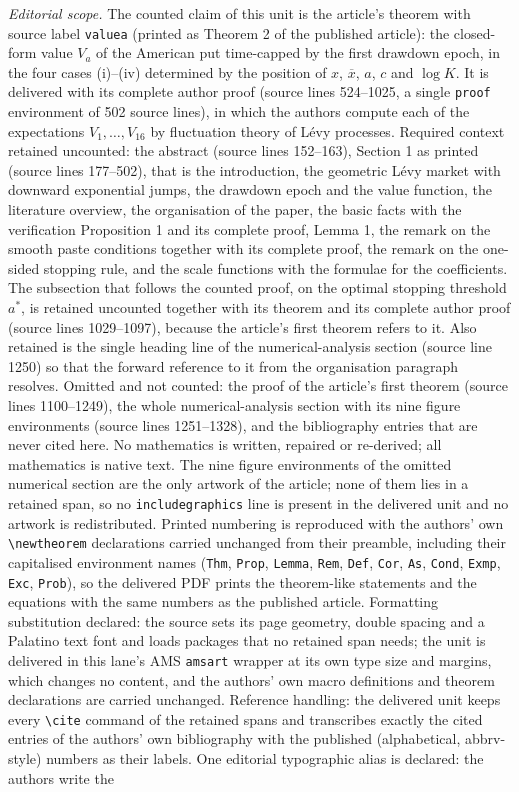 \documentclass[10pt,a4paper]{amsart}
\begin{document}
\noindent\textit{Editorial scope.} The counted claim of this unit is the article's theorem with source label \texttt{valuea} (printed as Theorem 2 of the published article): the closed-form value $V_a$ of the American put time-capped by the first drawdown epoch, in the four cases (i)--(iv) determined by the position of $x$, $\overline{x}$, $a$, $c$ and $\log K$. It is delivered with its complete author proof (source lines 524--1025, a single \texttt{proof} environment of 502 source lines), in which the authors compute each of the expectations $V_1,\dots,V_{16}$ by fluctuation theory of L\'evy processes. Required context retained uncounted: the abstract (source lines 152--163), Section 1 as printed (source lines 177--502), that is the introduction, the geometric L\'evy market with downward exponential jumps, the drawdown epoch and the value function, the literature overview, the organisation of the paper, the basic facts with the verification Proposition 1 and its complete proof, Lemma 1, the remark on the smooth paste conditions together with its complete proof, the remark on the one-sided stopping rule, and the scale functions with the formulae for the coefficients. The subsection that follows the counted proof, on the optimal stopping threshold $a^*$, is retained uncounted together with its theorem and its complete author proof (source lines 1029--1097), because the article's first theorem refers to it. Also retained is the single heading line of the numerical-analysis section (source line 1250) so that the forward reference to it from the organisation paragraph resolves. Omitted and not counted: the proof of the article's first theorem (source lines 1100--1249), the whole numerical-analysis section with its nine figure environments (source lines 1251--1328), and the bibliography entries that are never cited here. No mathematics is written, repaired or re-derived; all mathematics is native text. The nine figure environments of the omitted numerical section are the only artwork of the article; none of them lies in a retained span, so no \texttt{includegraphics} line is present in the delivered unit and no artwork is redistributed. Printed numbering is reproduced with the authors' own \texttt{\textbackslash newtheorem} declarations carried unchanged from their preamble, including their capitalised environment names (\texttt{Thm}, \texttt{Prop}, \texttt{Lemma}, \texttt{Rem}, \texttt{Def}, \texttt{Cor}, \texttt{As}, \texttt{Cond}, \texttt{Exmp}, \texttt{Exc}, \texttt{Prob}), so the delivered PDF prints the theorem-like statements and the equations with the same numbers as the published article. Formatting substitution declared: the source sets its page geometry, double spacing and a Palatino text font and loads packages that no retained span needs; the unit is delivered in this lane's AMS \texttt{amsart} wrapper at its own type size and margins, which changes no content, and the authors' own macro definitions and theorem declarations are carried unchanged. Reference handling: the delivered unit keeps every \texttt{\textbackslash cite} command of the retained spans and transcribes exactly the cited entries of the authors' own bibliography with the published (alphabetical, abbrv-style) numbers as their labels. One editorial typographic alias is declared: the authors write the 
\end{document}

